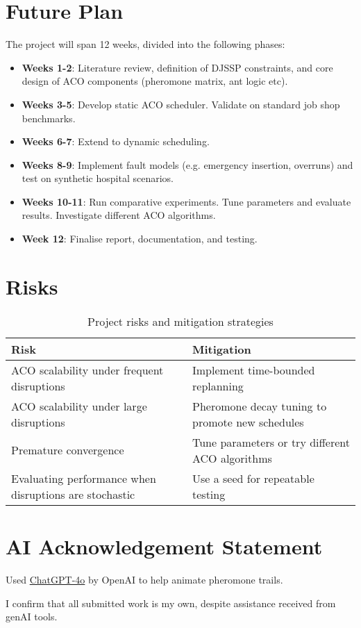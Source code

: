 \documentclass[project-plan]{report-template}
\begin{document}
\section{Future Plan}
The project will span 12 weeks, divided into the following phases:

\begin{itemize}
    \item \textbf{Weeks 1-2}: Literature review, definition of DJSSP constraints, and core design of ACO components (pheromone matrix, ant logic etc).
    \item \textbf{Weeks 3-5}: Develop static ACO scheduler. Validate on standard job shop benchmarks.
    \item \textbf{Weeks 6-7}: Extend to dynamic scheduling.
    \item \textbf{Weeks 8-9}: Implement fault models (e.g. emergency insertion, overruns) and test on synthetic hospital scenarios.
    \item \textbf{Weeks 10-11}: Run comparative experiments. Tune parameters and evaluate results. Investigate different ACO algorithms.
    \item \textbf{Week 12}: Finalise report, documentation, and testing.
\end{itemize}

\section{Risks}
\begin{table}[H]
\centering
\begin{tabularx}{\textwidth}{||X|X||}
\hline
\textbf{Risk} & \textbf{Mitigation} \\
\hline
ACO scalability under frequent disruptions & Implement time-bounded replanning \\
ACO scalability under large disruptions & Pheromone decay tuning to promote new schedules \\
Premature convergence & Tune parameters or try different ACO algorithms \\
Evaluating performance when disruptions are stochastic & Use a seed for repeatable testing \\
\hline
\end{tabularx}
\caption{Project risks and mitigation strategies}
\end{table}


\section{AI Acknowledgement Statement}
Used \href{https://chatgpt.com/}{ChatGPT-4o} by OpenAI to help animate pheromone trails.

I confirm that all submitted work is my own, despite assistance received from genAI tools.


\printbibliography[title = References, heading=bibintoc]
\end{document}

